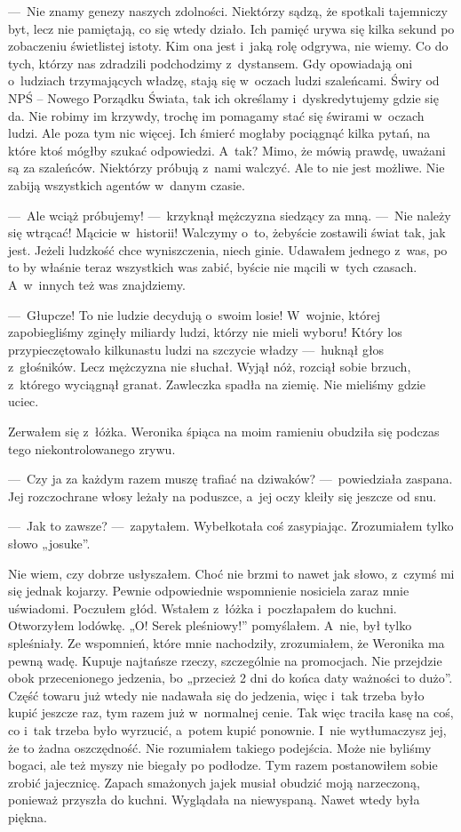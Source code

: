 ---~Nie znamy genezy naszych zdolności. Niektórzy sądzą, że spotkali tajemniczy byt, lecz nie pamiętają, co się wtedy działo. Ich pamięć urywa się kilka sekund po zobaczeniu świetlistej istoty. Kim ona jest i~jaką rolę odgrywa, nie wiemy. Co do tych, którzy nas zdradzili podchodzimy z~dystansem. Gdy opowiadają oni o~ludziach trzymających władzę, stają się w~oczach ludzi szaleńcami. Świry od NPŚ -- Nowego Porządku Świata, tak ich określamy i~dyskredytujemy gdzie się da. Nie robimy im krzywdy, trochę im pomagamy stać się świrami w~oczach ludzi. Ale poza tym nic więcej. Ich śmierć mogłaby pociągnąć kilka pytań, na które ktoś mógłby szukać odpowiedzi. A~tak? Mimo, że mówią prawdę, uważani są za szaleńców. Niektórzy próbują z~nami walczyć. Ale to nie jest możliwe. Nie zabiją wszystkich agentów w~danym czasie.

---~Ale wciąż próbujemy! ---~krzyknął mężczyzna siedzący za mną. ---~Nie należy się wtrącać! Mącicie w~historii! Walczymy o~to, żebyście zostawili świat tak, jak jest. Jeżeli ludzkość chce wyniszczenia, niech ginie. Udawałem jednego z~was, po to by właśnie teraz wszystkich was zabić, byście nie mącili w~tych czasach. A~w~innych też was znajdziemy.

---~Głupcze! To nie ludzie decydują o~swoim losie! W~wojnie, której zapobiegliśmy zginęły miliardy ludzi, którzy nie mieli wyboru! Który los przypieczętowało kilkunastu ludzi na szczycie władzy ---~huknął głos z~głośników. Lecz mężczyzna nie słuchał. Wyjął nóż, rozciął sobie brzuch, z~którego wyciągnął granat. Zawleczka spadła na ziemię. Nie mieliśmy gdzie uciec.

Zerwałem się z~łóżka. Weronika śpiąca na moim ramieniu obudziła się podczas tego niekontrolowanego zrywu.

---~Czy ja za każdym razem muszę trafiać na dziwaków? ---~powiedziała zaspana. Jej rozczochrane włosy leżały na poduszce, a~jej oczy kleiły się jeszcze od snu.

---~Jak to zawsze? ---~zapytałem. Wybełkotała coś zasypiając. Zrozumiałem tylko słowo „josuke”.

Nie wiem, czy dobrze usłyszałem. Choć nie brzmi to nawet jak słowo, z~czymś mi się jednak kojarzy. Pewnie odpowiednie wspomnienie nosiciela zaraz mnie uświadomi. Poczułem głód. Wstałem z~łóżka i~poczłapałem do kuchni. Otworzyłem lodówkę. „O! Serek pleśniowy!” pomyślałem. A~nie, był tylko spleśniały. Ze wspomnień, które mnie nachodziły, zrozumiałem, że Weronika ma pewną wadę. Kupuje najtańsze rzeczy, szczególnie na promocjach. Nie przejdzie obok przecenionego jedzenia, bo „przecież 2 dni do końca daty ważności to dużo”. Część towaru już wtedy nie nadawała się do jedzenia, więc i~tak trzeba było kupić jeszcze raz, tym razem już w~normalnej cenie. Tak więc traciła kasę na coś, co i~tak trzeba było wyrzucić, a~potem kupić ponownie. I~nie wytłumaczysz jej, że to żadna oszczędność. Nie rozumiałem takiego podejścia. Może nie byliśmy bogaci, ale też myszy nie biegały po podłodze. Tym razem postanowiłem sobie zrobić jajecznicę. Zapach smażonych jajek musiał obudzić moją narzeczoną, ponieważ przyszła do kuchni. Wyglądała na niewyspaną. Nawet wtedy była piękna.


